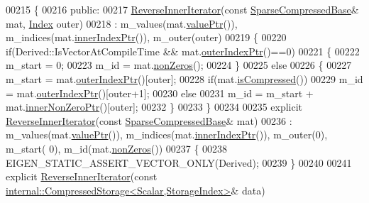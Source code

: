 \begin{DoxyCode}
00215 \{
00216   \textcolor{keyword}{public}:
00217     \hyperlink{class_eigen_1_1_sparse_compressed_base_1_1_reverse_inner_iterator}{ReverseInnerIterator}(\textcolor{keyword}{const} \hyperlink{group___sparse_core___module_class_eigen_1_1_sparse_compressed_base}{SparseCompressedBase}& mat, 
      \hyperlink{group___core___module_a554f30542cc2316add4b1ea0a492ff02}{Index} outer)
00218       : m\_values(mat.\hyperlink{group___sparse_core___module_a0f44c739398794ea77f310b745cc5627}{valuePtr}()), m\_indices(mat.\hyperlink{group___sparse_core___module_aa64818e1aa43015dad01b114b2ab4687}{innerIndexPtr}()), m\_outer(outer)
00219     \{
00220       \textcolor{keywordflow}{if}(Derived::IsVectorAtCompileTime && mat.\hyperlink{group___sparse_core___module_a2624d4c2661c582de168246c56e8d71e}{outerIndexPtr}()==0)
00221       \{
00222         m\_start = 0;
00223         m\_id = mat.\hyperlink{group___sparse_core___module_a03de8b3da2c142ce8698a76123b3e7d3}{nonZeros}();
00224       \}
00225       \textcolor{keywordflow}{else}
00226       \{
00227         m\_start = mat.\hyperlink{group___sparse_core___module_a2624d4c2661c582de168246c56e8d71e}{outerIndexPtr}()[outer];
00228         \textcolor{keywordflow}{if}(mat.\hyperlink{group___sparse_core___module_a837934b33a80fe996ff20500373d3a61}{isCompressed}())
00229           m\_id = mat.\hyperlink{group___sparse_core___module_a2624d4c2661c582de168246c56e8d71e}{outerIndexPtr}()[outer+1];
00230         \textcolor{keywordflow}{else}
00231           m\_id = m\_start + mat.\hyperlink{group___sparse_core___module_afc056a3895eae1a4c4767252ff04966a}{innerNonZeroPtr}()[outer];
00232       \}
00233     \}
00234 
00235     \textcolor{keyword}{explicit} \hyperlink{class_eigen_1_1_sparse_compressed_base_1_1_reverse_inner_iterator}{ReverseInnerIterator}(\textcolor{keyword}{const} \hyperlink{group___sparse_core___module_class_eigen_1_1_sparse_compressed_base}{SparseCompressedBase}& mat)
00236       : m\_values(mat.\hyperlink{group___sparse_core___module_a0f44c739398794ea77f310b745cc5627}{valuePtr}()), m\_indices(mat.\hyperlink{group___sparse_core___module_aa64818e1aa43015dad01b114b2ab4687}{innerIndexPtr}()), m\_outer(0), m\_start(
      0), m\_id(mat.\hyperlink{group___sparse_core___module_a03de8b3da2c142ce8698a76123b3e7d3}{nonZeros}())
00237     \{
00238       EIGEN\_STATIC\_ASSERT\_VECTOR\_ONLY(Derived);
00239     \}
00240 
00241     \textcolor{keyword}{explicit} \hyperlink{class_eigen_1_1_sparse_compressed_base_1_1_reverse_inner_iterator}{ReverseInnerIterator}(\textcolor{keyword}{const} 
      \hyperlink{class_eigen_1_1internal_1_1_compressed_storage}{internal::CompressedStorage<Scalar,StorageIndex>}& data)

\end{DoxyCode}
